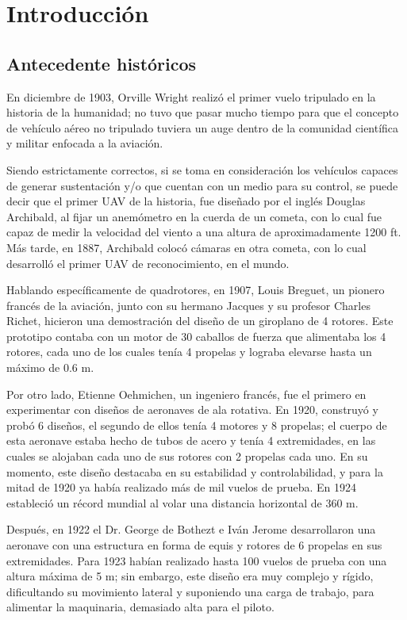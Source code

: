 \chapter{Introducción}

\section{Antecedente históricos}
En diciembre de 1903, Orville Wright realizó el primer vuelo tripulado en la historia de la humanidad; no tuvo que pasar mucho tiempo para que el concepto de vehículo aéreo no tripulado tuviera un auge dentro de la comunidad científica y militar enfocada a la aviación.

Siendo estrictamente correctos, si se toma en consideración los vehículos capaces de generar sustentación y/o que cuentan con un medio para su control, se puede decir que el primer UAV de la historia, fue diseñado por el inglés Douglas Archibald, al fijar un anemómetro en la cuerda de un cometa, con lo cual fue capaz de medir  la velocidad del viento a una altura de aproximadamente 1200 ft. Más tarde, en 1887, Archibald colocó cámaras en otra cometa, con lo cual desarrolló el primer UAV de reconocimiento, en el mundo.

Hablando específicamente de quadrotores, en 1907, Louis Breguet, un pionero francés de la aviación, junto con su hermano Jacques y su profesor Charles Richet, hicieron una demostración del diseño de un giroplano de 4 rotores. Este prototipo contaba con un motor de 30 caballos de fuerza que alimentaba los 4 rotores, cada uno de los cuales tenía 4 propelas y lograba elevarse hasta un máximo de 0.6 m.

Por otro lado, Etienne Oehmichen, un ingeniero francés, fue el primero en experimentar con diseños de aeronaves de ala rotativa. En 1920, construyó y probó 6 diseños, el segundo de ellos tenía 4 motores y 8 propelas; el cuerpo de esta aeronave estaba hecho de tubos de acero y tenía 4 extremidades, en las cuales se alojaban cada uno de sus rotores con 2 propelas cada uno. En su momento, este diseño destacaba en su estabilidad y controlabilidad, y para la mitad de 1920 ya había realizado más de mil vuelos de prueba. En 1924 estableció un récord mundial al volar una distancia horizontal de 360 m.

Después, en 1922 el Dr. George de Bothezt e Iván Jerome desarrollaron una aeronave con una estructura en forma de equis y rotores de 6 propelas en sus extremidades. Para 1923 habían realizado hasta 100 vuelos de prueba con una altura máxima de 5 m; sin embargo, este diseño era muy complejo y rígido, dificultando su movimiento lateral y suponiendo una  carga de trabajo, para alimentar la maquinaria, demasiado alta para el piloto.

